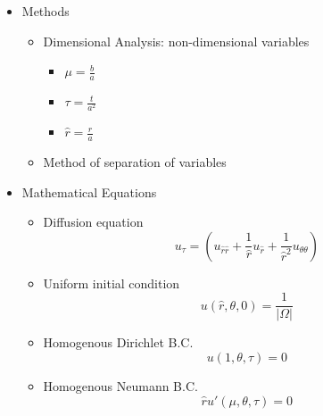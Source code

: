 
       \begin{itemize}

          \item Methods
         
            \begin{itemize}
              \item Dimensional Analysis: non-dimensional variables
                \begin{itemize}
                   \item $\mu = \frac{b}{a}$
                   \item $\tau = \frac{t}{a^2}$
                   \item $\hat r = \frac{r}{a}$
                \end{itemize}
                
              \item Method of separation of variables
            \end{itemize}
            
          \item Mathematical Equations

            \begin{itemize}
              
               \item Diffusion equation
                 \begin{equation}\label{eq:DA_polar_diffusion}
                   u_\tau = (u_{\hat r \hat r} + \frac{1}{\hat r} u_{\hat r} + \frac{1}{\hat r ^2} u_{\theta\theta})
                 \end{equation}
                 
               \item Uniform initial condition
                 \begin{equation}\label{eq:DA_initial_bc}
                   u(\hat r, \theta, 0) = \frac{1}{|\Omega|}
                 \end{equation}
                 
               \item Homogenous Dirichlet B.C.
                 \begin{equation}\label{eq:DA_Dirichlet_bc}
                   u(1, \theta, \tau) = 0
                 \end{equation}
                 
               \item Homogenous Neumann B.C.
                 \begin{equation}\label{eq:DA_Neumann_bc}
                   \hat r u'(\mu, \theta, \tau) = 0
                 \end{equation}
            \end{itemize}
       \end{itemize}
       

